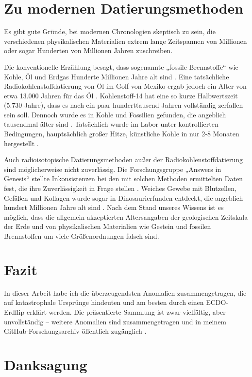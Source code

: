 \documentclass[10pt,twocolumn,letterpaper]{article}
\begin{document}
\section{Zu modernen Datierungsmethoden}

Es gibt gute Gründe, bei modernen Chronologien skeptisch zu sein, die verschiedenen physikalischen Materialien extrem lange Zeitspannen von Millionen oder sogar Hunderten von Millionen Jahren zuschreiben.

Die konventionelle Erzählung besagt, dass sogenannte „fossile Brennstoffe“ wie Kohle, Öl und Erdgas Hunderte Millionen Jahre alt sind \cite{104}. Eine tatsächliche Radiokohlenstoffdatierung von Öl im Golf von Mexiko ergab jedoch ein Alter von etwa 13.000 Jahren für das Öl \cite{105}. Kohlenstoff-14 hat eine so kurze Halbwertszeit (5.730 Jahre), dass es nach ein paar hunderttausend Jahren vollständig zerfallen sein soll. Dennoch wurde es in Kohle und Fossilien gefunden, die angeblich tausendmal älter sind \cite{106}. Tatsächlich wurde im Labor unter kontrollierten Bedingungen, hauptsächlich großer Hitze, künstliche Kohle in nur 2-8 Monaten hergestellt \cite{107}.

Auch radioisotopische Datierungsmethoden außer der Radiokohlenstoffdatierung sind möglicherweise nicht zuverlässig. Die Forschungsgruppe „Answers in Genesis“ stellte Inkonsistenzen bei den mit solchen Methoden ermittelten Daten fest, die ihre Zuverlässigkeit in Frage stellen \cite{108}. Weiches Gewebe mit Blutzellen, Gefäßen und Kollagen wurde sogar in Dinosaurierfunden entdeckt, die angeblich hundert Millionen Jahre alt sind \cite{109,110}. Nach dem Stand unseres Wissens ist es möglich, dass die allgemein akzeptierten Altersangaben der geologischen Zeitskala der Erde und von physikalischen Materialien wie Gestein und fossilen Brennstoffen um viele Größenordnungen falsch sind.

\section{Fazit}

In dieser Arbeit habe ich die überzeugendsten Anomalien zusammengetragen, die auf katastrophale Ursprünge hindeuten und am besten durch einen ECDO-Erdflip erklärt werden. Die präsentierte Sammlung ist zwar vielfältig, aber unvollständig – weitere Anomalien sind zusammengetragen und in meinem GitHub-Forschungsarchiv öffentlich zugänglich \cite{2}.

\section{Danksagung}
\end{document}
